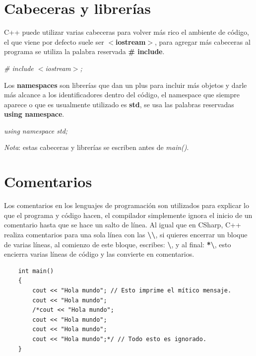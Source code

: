 \section{Cabeceras y librerías}
\hspace{0.55cm}C++ puede utilizar varias cabeceras para volver más rico el ambiente de código, el que viene por defecto suele ser \textbf{$<$iostream$>$}, para agregar más cabeceras al programa se utiliza la palabra reservada \textbf{\# include}.
\begin{center}
	\textit{\# include $<$iostream$>$;}
\end{center}

Los \textbf{namespaces} son librerías que dan un plus para incluir más objetos y darle más alcance a los identificadores dentro del código, el namespace que siempre aparece o que es usualmente utilizado es \textbf{std}, se usa las palabras reservadas \textbf{using namespace}.
\begin{center}
	\textit{using namespace std;}
\end{center}

\textit{Nota}: estas cabeceras y librerías se escriben antes de \textit{main()}.



\section{Comentarios}
\hspace{0.55cm}Los comentarios en los lenguajes de programación son utilizados para explicar lo que el programa y código hacen, el compilador simplemente ignora el inicio de un comentario hasta que se hace un salto de línea. Al igual que en CSharp, C++ realiza comentarios para una sola línea con las \textbf{\textbackslash\textbackslash}, si quieres encerrar un bloque de varias líneas, al comienzo de este bloque, escribes: \textbf{\textbackslash *}, y al final: \textbf{*\textbackslash}, esto encierra varias líneas de código y las convierte en comentarios.
\begin{lstlisting}
    int main()
    {
        cout << "Hola mundo"; // Esto imprime el mítico mensaje.
        cout << "Hola mundo";
        /*cout << "Hola mundo";
        cout << "Hola mundo";
        cout << "Hola mundo";
        cout << "Hola mundo";*/ // Todo esto es ignorado.
    }
\end{lstlisting}



